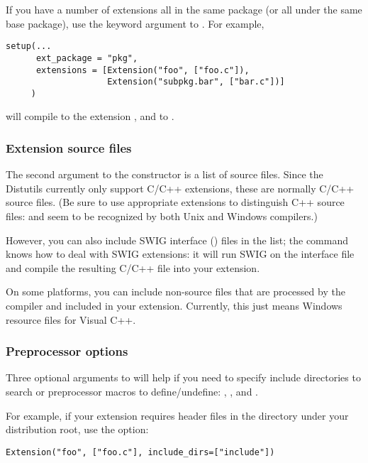 \documentclass{howto}
\begin{document}
If you have a number of extensions all in the same package (or all under
the same base package), use the  keyword argument
to .  For example,
\begin{verbatim}
setup(...
      ext_package = "pkg",
      extensions = [Extension("foo", ["foo.c"]),
                    Extension("subpkg.bar", ["bar.c"])]
     )
\end{verbatim}
will compile  to the extension , and
 to .


\subsubsection{Extension source files}

The second argument to the  constructor is a list of
source files.  Since the Distutils currently only support C/C++
extensions, these are normally C/C++ source files.  (Be sure to use
appropriate extensions to distinguish C++ source files:  and
 seem to be recognized by both Unix and Windows compilers.)

However, you can also include SWIG interface () files in the
list; the  command knows how to deal with SWIG
extensions: it will run SWIG on the interface file and compile the
resulting C/C++ file into your extension.


On some platforms, you can include non-source files that are processed
by the compiler and included in your extension.  Currently, this just
means Windows resource files for Visual C++.  


\subsubsection{Preprocessor options}

Three optional arguments to  will help if you need to
specify include directories to search or preprocessor macros to
define/undefine: , , and
.

For example, if your extension requires header files in the
 directory under your distribution root, use the
 option:
\begin{verbatim}
Extension("foo", ["foo.c"], include_dirs=["include"])
\end{verbatim}
\end{document}
